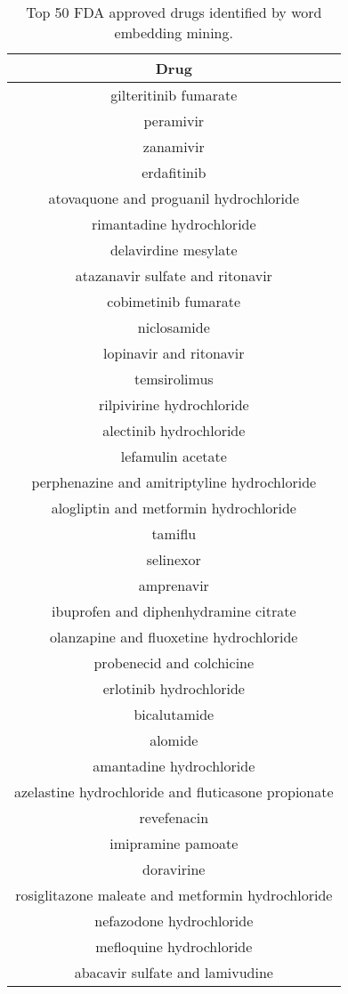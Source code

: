 \documentclass{article}
\newcommand{\lgc}[1]{\cellcolor[gray]{0.85}#1}
\begin{document}
\begin{table}[ht]
\small
\centering
\caption{Top 50 FDA approved drugs identified by word embedding mining.}
\label{tab:drugs_top50}
\begin{tabular}[t]{c}
\hline
Drug \\
\hline
gilteritinib fumarate \\
peramivir \\
zanamivir \\
erdafitinib \\
atovaquone and proguanil hydrochloride \\
rimantadine hydrochloride \\
delavirdine mesylate \\
\lgc{atazanavir sulfate and ritonavir} \\
cobimetinib fumarate \\
niclosamide \\
\lgc{lopinavir and ritonavir} \\
temsirolimus \\
rilpivirine hydrochloride \\
alectinib hydrochloride \\
lefamulin acetate \\
perphenazine and amitriptyline hydrochloride \\
alogliptin and metformin hydrochloride \\
tamiflu \\
selinexor \\
amprenavir \\
ibuprofen and diphenhydramine citrate \\
olanzapine and fluoxetine hydrochloride \\
\lgc{probenecid and colchicine} \\
erlotinib hydrochloride \\
bicalutamide \\
alomide \\
amantadine hydrochloride \\
azelastine hydrochloride and fluticasone propionate \\
revefenacin \\
imipramine pamoate \\
doravirine \\
rosiglitazone maleate and metformin hydrochloride \\
nefazodone hydrochloride \\
\lgc{mefloquine hydrochloride} \\
abacavir sulfate and lamivudine \\

\end{tabular}
\end{table}
\end{document}
